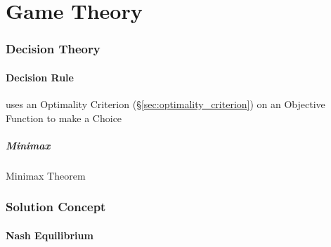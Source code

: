 \part{Game Theory}\label{sec:game_theory}

\section{Decision Theory}\label{sec:decision_theory}

\subsection{Decision Rule}\label{sec:decision_rule}

uses an Optimality Criterion (\S\ref{sec:optimality_criterion}) on an Objective
Function to make a Choice



\subsubsection{Minimax}\label{sec:minimax}

Minimax Theorem



\section{Solution Concept}\label{sec:solution_concept}

\subsection{Nash Equilibrium}\label{sec:nash_equilibrium}


